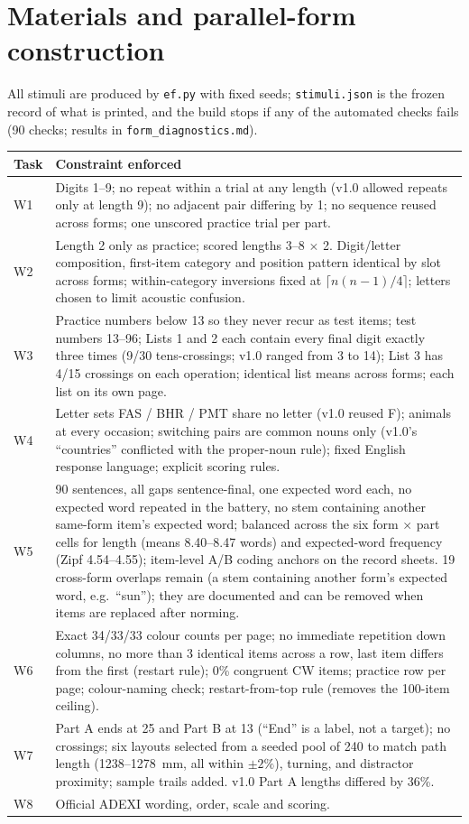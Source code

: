 \documentclass[11pt,a4paper]{article}
\begin{document}
\section{Materials and parallel-form construction}
All stimuli are produced by \texttt{ef.py} with fixed seeds; \texttt{stimuli.json} is the frozen record of what is printed, and the build stops if any of the automated checks fails (90 checks; results in \texttt{form\_diagnostics.md}).

\begin{longtable}{@{}p{1.2cm}p{14.3cm}@{}}
\toprule
Task & Constraint enforced \\ \midrule
W1 & Digits 1--9; no repeat within a trial at any length (v1.0 allowed repeats only at length 9); no adjacent pair differing by 1; no sequence reused across forms; one unscored practice trial per part. \\
W2 & Length 2 only as practice; scored lengths 3--8 $\times$ 2. Digit/letter composition, first-item category and position pattern identical by slot across forms; within-category inversions fixed at $\lceil n(n-1)/4\rceil$; letters chosen to limit acoustic confusion. \\
W3 & Practice numbers below 13 so they never recur as test items; test numbers 13--96; Lists 1 and 2 each contain every final digit exactly three times (9/30 tens-crossings; v1.0 ranged from 3 to 14); List 3 has 4/15 crossings on each operation; identical list means across forms; each list on its own page. \\
W4 & Letter sets FAS / BHR / PMT share no letter (v1.0 reused F); animals at every occasion; switching pairs are common nouns only (v1.0's ``countries'' conflicted with the proper-noun rule); fixed English response language; explicit scoring rules. \\
W5 & 90 sentences, all gaps sentence-final, one expected word each, no expected word repeated in the battery, no stem containing another same-form item's expected word; balanced across the six form $\times$ part cells for length (means 8.40--8.47 words) and expected-word frequency (Zipf 4.54--4.55); item-level A/B coding anchors on the record sheets. 19 cross-form overlaps remain (a stem containing another form's expected word, e.g.\ ``sun''); they are documented and can be removed when items are replaced after norming. \\
W6 & Exact 34/33/33 colour counts per page; no immediate repetition down columns, no more than 3 identical items across a row, last item differs from the first (restart rule); 0\% congruent CW items; practice row per page; colour-naming check; restart-from-top rule (removes the 100-item ceiling). \\
W7 & Part A ends at 25 and Part B at 13 (``End'' is a label, not a target); no crossings; six layouts selected from a seeded pool of 240 to match path length (1238--1278~mm, all within $\pm2\%$), turning, and distractor proximity; sample trails added. v1.0 Part A lengths differed by 36\%. \\
W8 & Official ADEXI wording, order, scale and scoring. \\
\bottomrule
\end{longtable}
\end{document}
